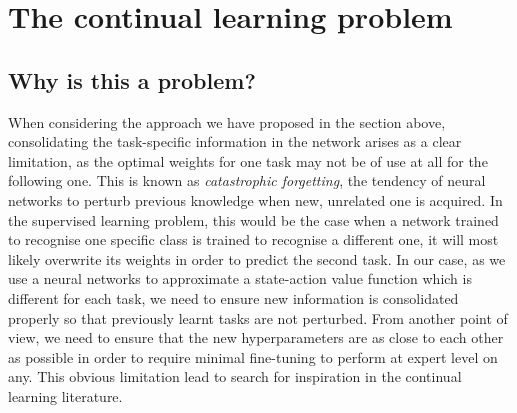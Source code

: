 \documentclass{article}
\begin{document}
\section{The continual learning problem}
\subsection{Why is this a problem?}
When considering the approach we have proposed in the section above, consolidating the task-specific information in the network arises as a clear limitation, as the optimal weights for one task may not be of use at all for the following one. This is known as \textit{catastrophic forgetting}, the tendency of neural networks to perturb previous knowledge when new, unrelated one is acquired. In the supervised learning problem, this would be the case when a network trained to recognise one specific class is trained to recognise a different one, it will most likely overwrite its weights in order to predict the second task. In our case, as we use a neural networks to approximate a state-action value function which is different for each task, we need to ensure new information is consolidated properly so that previously learnt tasks are not perturbed. From another point of view, we need to ensure that the new hyperparameters are as close to each other as possible in order to require minimal fine-tuning to perform at expert level on any. This obvious limitation lead to search for inspiration in the continual learning literature.
\end{document}
